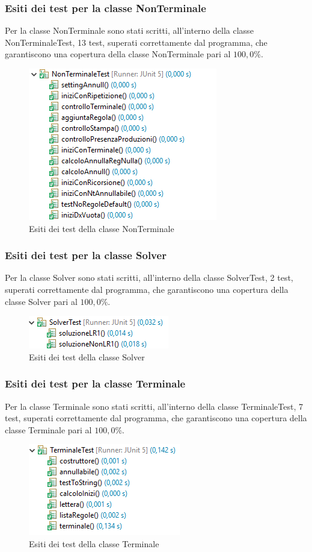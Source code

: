 \documentclass[12pt]{article}
\begin{document}
\subsubsection{Esiti dei test per la classe NonTerminale}
Per la classe NonTerminale sono stati scritti, all'interno della classe NonTerminaleTest, 13 test, superati correttamente dal programma, che garantiscono una copertura della classe NonTerminale pari al $100,0\%$.
\begin{figure}[h]
\centering
\includegraphics[scale=0.9]{immagini/esitiNonTerminaleTest.png}
\caption{Esiti dei test della classe NonTerminale}
\end{figure}
\pagebreak
\subsubsection{Esiti dei test per la classe Solver}
Per la classe Solver sono stati scritti, all'interno della classe SolverTest, 2 test, superati correttamente dal programma, che garantiscono una copertura della classe Solver pari al $100,0\%$.
\begin{figure}[h]
\centering
\includegraphics[scale=0.9]{immagini/esitiSolverTest.png}
\caption{Esiti dei test della classe Solver}
\end{figure}
\subsubsection{Esiti dei test per la classe Terminale}
Per la classe Terminale sono stati scritti, all'interno della classe TerminaleTest, 7 test, superati correttamente dal programma, che garantiscono una copertura della classe Terminale pari al $100,0\%$.
\begin{figure}[h]
\centering
\includegraphics[scale=0.9]{immagini/esitiTerminaleTest.png}
\caption{Esiti dei test della classe Terminale}
\end{figure}
\pagebreak
\end{document}
